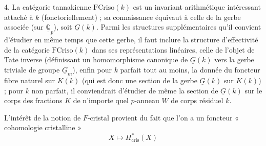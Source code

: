 \documentclass[11pt,a4paper]{article}
\begin{document}
4. \quad La catégorie tannakienne $\mathrm{FCriso}(k)$ est un invariant
arithmétique intéressant attaché à $k$ (fonctoriellement) ; sa
\struck{\ill{}} connaissance équivaut à celle de la gerbe associée (sur
$\underline{\mathbb{Q}}_{p}$), soit $\underline{G}(k)$. Parmi les structures
supplémentaires qu'il convient d'étudier en même temps que cette gerbe, il
faut inclure la structure d'effectivité de la catégorie
$\mathrm{FCriso}(k)$ dans ses représentations linéaires, celle de l'objet de
Tate inverse (définissant un homomorphisme canonique de $\underline{G}(k)$
vers la gerbe triviale de groupe $\underline{G}_{m}$), enfin pour $k$ parfait
tout au moins, la donnée du foncteur fibre naturel sur $K(k)$ (qui est donc
une section de la gerbe $\underline{G}(k)$ sur $K(k)$) ; pour $k$ non
parfait, il conviendrait d'étudier de même la section de
$\underline{G}(k)$ sur le corps des fractions $K$ de n'importe quel
$p$-anneau $W$ de corps résiduel $k$.

L'intérêt de la notion de $F$-cristal  provient du fait
que l'on a un foncteur « cohomologie cristalline »
\[
X \longmapsto H^{*}_{\mathrm{cris}}(X)
\]
\end{document}

